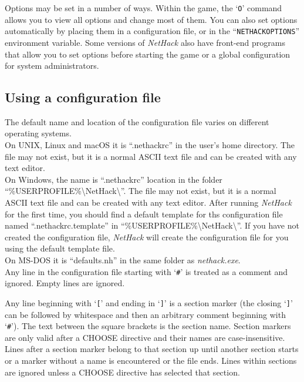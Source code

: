 \documentclass[titlepage]{article}
\begin{document}
Options may be set in a number of ways.  Within the game, the `\texttt{O}'
command allows you to view all options and change most of them.
You can also set options automatically by placing them in a configuration
file, or in the ``\texttt{NETHACKOPTIONS}'' environment variable.
Some versions of \textit{NetHack} also have front-end programs that allow
you to set options before starting the game or a global configuration
for system administrators.

\subsection*{Using a configuration file}

The default name and location of the configuration file varies on different
operating systems.\\

On UNIX, Linux and macOS it is \mbox{``.nethackrc''} in the user's home
directory.
The file may not exist, but it is a normal ASCII text file and
can be created with any text editor.\\

On Windows, the name is \mbox{``.nethackrc''} location in the folder
\mbox{{``\%USERPROFILE\%\textbackslash NetHack\textbackslash''}}.
The file may not exist,
but it is a normal ASCII text file and can be created with any
text editor.
After running \textit{NetHack} for the first time, you should find a default
template for ths configuration file named \mbox{``.nethackrc.template''} in
\mbox{{``\%USERPROFILE\%\textbackslash NetHack\textbackslash''}}.
If you have not created the configuration file, \textit{NetHack} will create
the configuration file for you using the default template file.\\

On MS-DOS it is \mbox{``defaults.nh''} in the same folder as
\mbox{\textit{nethack.exe}}.\\

Any line in the configuration file starting with `\texttt{\#}' is treated
as a comment and ignored.
Empty lines are ignored.

Any line beginning with `\texttt{[}' and ending in `\texttt{]}'
is a section marker (the closing `\texttt{]}' can be followed
by whitespace and then an arbitrary comment beginning with `\texttt{\#}').
The text between the square brackets is the section name.
Section markers are only valid after a CHOOSE directive and their names
are case-insensitive.
Lines after a section marker belong to that section up until another
section starts or a marker without a name is encountered or the file ends.
Lines within sections are ignored unless a CHOOSE directive has selected
that section.
\end{document}

